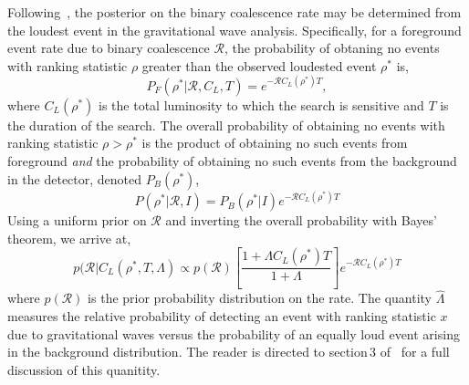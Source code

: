 \documentclass[twocolumn,nofootinbib]{revtex4}
\newcommand{\gw}{gravitational wave }
\newcommand{\gws}{gravitational waves }
\newcommand{\cbcrate}{{{\mathcal R}}}
\newcommand{\rhostar}{{\rho^*}}
\begin{document}
Following~\cite{Biswas09,BradyFairhurst08}, the posterior on the binary
coalescence rate may be determined from the loudest event in the \gw
analysis.  Specifically, for a foreground event rate due to  binary coalescence
$\cbcrate$, the probability of obtaning no events with ranking statistic $\rho$
greater than the observed loudested event $\rhostar$ is,
%
\begin{equation}
P_F(\rhostar | \cbcrate, C_L, T) = e^{-\cbcrate C_L(\rhostar) T},
\end{equation}
%
where $C_L(\rhostar)$ is the total luminosity to which the search is sensitive
and $T$ is the duration of the search.  The overall probability of obtaining
no events with ranking statistic $\rho>\rhostar$ is the product of obtaining
no such events from foreground \emph{and} the probability of obtaining no such
events from the background in the detector, denoted $P_B(\rhostar)$,
%
\begin{equation}
P(\rhostar|\cbcrate,I) = P_B(\rhostar|I)e^{-\cbcrate C_L(\rhostar) T}
\end{equation}
%
Using a uniform prior on $\cbcrate$ and inverting the overall probability with
Bayes' theorem, we arrive at,
%
\begin{equation}\label{eq:loudestEventPosterior}
p(\cbcrate | C_L({\rhostar}, T, \Lambda) \propto p(\cbcrate) \left[ \frac{1+\Lambda
C_L(\rhostar) T}{1+\Lambda}\right] e^{-\cbcrate C_L(\rhostar) T}
\end{equation}
%
where $p(\cbcrate)$ is the prior probability distribution on the rate.  The
quantity $\hat{\Lambda}$ measures the relative probability of detecting an event
with ranking statistic $x$ due to \gws versus the probability of an equally loud
event arising in the background distribution.  The reader is directed to
section\,3 of~\cite{BradyFairhurst08} for a full discussion of this quanitity.
\end{document}
